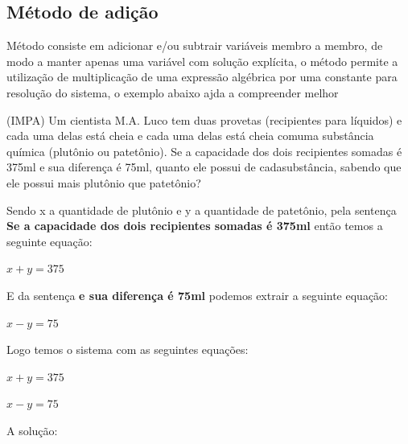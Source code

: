 \begin{multicols*}{2}
    \subsection*{Método de adição}
    Método consiste em adicionar e/ou subtrair variáveis membro a membro, de modo a manter apenas 			uma variável com solução explícita, o método permite a utilização de multiplicação de uma 				expressão algébrica por uma constante para resolução do sistema, o exemplo abaixo ajda a 				compreender melhor

    (IMPA) Um cientista M.A. Luco tem duas provetas (recipientes para líquidos) e cada uma delas 			está cheia e cada uma delas está cheia comuma substância química (plutônio ou patetônio). Se a 			capacidade dos dois recipientes somadas é 375ml e sua diferença é 75ml, quanto ele possui de 			cadasubstância, sabendo que ele possui mais plutônio que patetônio?

    Sendo x a quantidade de plutônio e y a quantidade de patetônio, pela sentença \textbf{ Se a 			capacidade dos dois recipientes somadas é 375ml} então temos a seguinte equação:

    $x + y = 375 $

    E da sentença \textbf{e sua diferença é 75ml} podemos extrair a seguinte equação:

    $x - y = 75$

    Logo temos o sistema com as seguintes equações:

    $x + y = 375 $

    $x - y = 75$

    A solução:




    \begin{figure}[H]
        \centering
\end{figure}
\end{multicols*}
